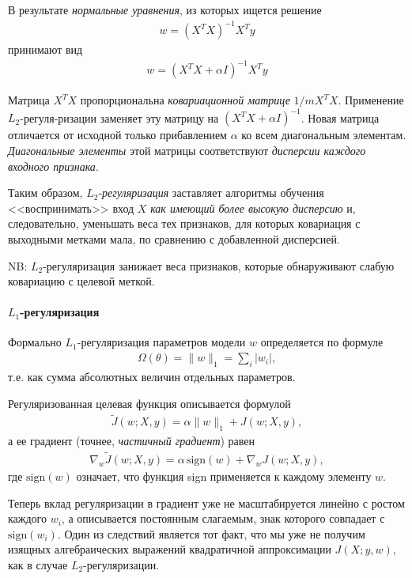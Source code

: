 \documentclass[%
	11pt,
	a4paper,
	utf8,
]{article}
\begin{document}
В результате \emph{нормальные уравнения}, из которых ищется решение
\begin{align*}
	w = (X^T X)^{-1} X^T y
\end{align*}
принимают вид
\begin{align*}
	w = (X^T X + \alpha I)^{-1} X^T y
\end{align*}

Матрица $ X^T X $ пропорциональна \emph{ковариационной матрице} $ 1 / m X^T X $. Применение $ L_2 $-регуля-ризации заменяет эту матрицу на $ (X^T X + \alpha I)^{-1} $. Новая матрица отличается от исходной только прибавлением $ \alpha $ ко всем диагональным элементам. \emph{Диагональные элементы} этой матрицы соответствуют \emph{дисперсии каждого входного признака}. 

Таким образом, $ L_2 $-\emph{регуляризация} заставляет алгоритмы обучения <<воспринимать>> вход $ X $ \emph{как имеющий более высокую дисперсию} и, следовательно, уменьшать веса тех признаков, для которых ковариация с выходными метками мала, по сравнению с добавленной дисперсией.

NB: $ L_2 $-регуляризация занижает веса признаков, которые обнаруживают слабую ковариацию с целевой меткой.

\paragraph{$ L_1 $-регуляризация}

Формально $ L_1 $-регуляризация параметров модели $ w $ определяется по формуле
\begin{align*}
	\Omega(\theta) = \| w \|_1 = \sum_i | w_i |,
\end{align*}
т.е. как сумма абсолютных величин отдельных параметров.

Регуляризованная целевая функция описывается формулой
\begin{align*}
	\tilde{J}(w; X, y) = \alpha \| w \|_1 + J(w; X, y),
\end{align*}
а ее градиент (точнее, \emph{частичный градиент}) равен
\begin{align*}
	\nabla_w \tilde{J}(w; X, y) = \alpha \, \text{sign}(w) + \nabla_w J(w; X, y),
\end{align*}
где $ \text{sign}(w) $ означает, что функция sign применяется к каждому элементу $ w $.

Теперь вклад регуляризации в градиент уже не масштабируется линейно с ростом каждого $ w_i $, а описывается постоянным слагаемым, знак которого совпадает с $ \text{sign}(w_i) $. Один из следствий является тот факт, что мы уже не получим изящных алгебраических выражений квадратичной аппроксимации $ J(X; y, w) $, как в случае $ L_2 $-регуляризации.
\end{document}
